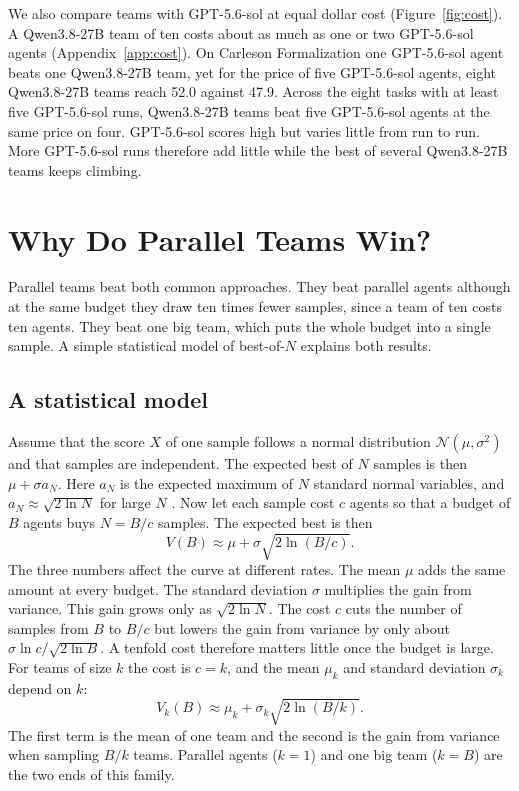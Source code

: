 \documentclass[numbers,10pt]{arxiv}
\begin{document}
We also compare teams with GPT-5.6-sol at equal dollar cost (Figure~\ref{fig:cost}). A Qwen3.8-27B team of ten costs about as much as one or two GPT-5.6-sol agents (Appendix~\ref{app:cost}). On Carleson Formalization one GPT-5.6-sol agent beats one Qwen3.8-27B team, yet for the price of five GPT-5.6-sol agents, eight Qwen3.8-27B teams reach 52.0 against 47.9. Across the eight tasks with at least five GPT-5.6-sol runs, Qwen3.8-27B teams beat five GPT-5.6-sol agents at the same price on four. GPT-5.6-sol scores high but varies little from run to run. More GPT-5.6-sol runs therefore add little while the best of several Qwen3.8-27B teams keeps climbing.

\section{Why Do Parallel Teams Win?}
\label{sec:why}

Parallel teams beat both common approaches. They beat parallel agents although at the same budget they draw ten times fewer samples, since a team of ten costs ten agents. They beat one big team, which puts the whole budget into a single sample. A simple statistical model of best-of-$N$ explains both results.

\subsection{A statistical model}
\label{sec:why-model}

Assume that the score $X$ of one sample follows a normal distribution $\mathcal{N}(\mu,\sigma^2)$ and that samples are independent. The expected best of $N$ samples is then $\mu+\sigma a_N$. Here $a_N$ is the expected maximum of $N$ standard normal variables, and $a_N\approx\sqrt{2\ln N}$ for large $N$ \citep[Appendix~\ref{app:normal};][]{fisher1928limiting,gnedenko1943limite}. Now let each sample cost $c$ agents so that a budget of $B$ agents buys $N=B/c$ samples. The expected best is then
\begin{equation}
V(B)\approx \mu+\sigma\sqrt{2\ln (B/c)}.
\label{eq:normal-budget}
\end{equation}
The three numbers affect the curve at different rates. The mean $\mu$ adds the same amount at every budget. The standard deviation $\sigma$ multiplies the gain from variance. This gain grows only as $\sqrt{2\ln N}$. The cost $c$ cuts the number of samples from $B$ to $B/c$ but lowers the gain from variance by only about $\sigma\ln c/\sqrt{2\ln B}$. A tenfold cost therefore matters little once the budget is large. For teams of size $k$ the cost is $c=k$, and the mean $\mu_k$ and standard deviation $\sigma_k$ depend on $k$:
\begin{equation}
V_k(B)\approx \mu_k+\sigma_k\sqrt{2\ln (B/k)}.
\label{eq:team-size}
\end{equation}
The first term is the mean of one team and the second is the gain from variance when sampling $B/k$ teams. Parallel agents ($k=1$) and one big team ($k=B$) are the two ends of this family.
\end{document}
